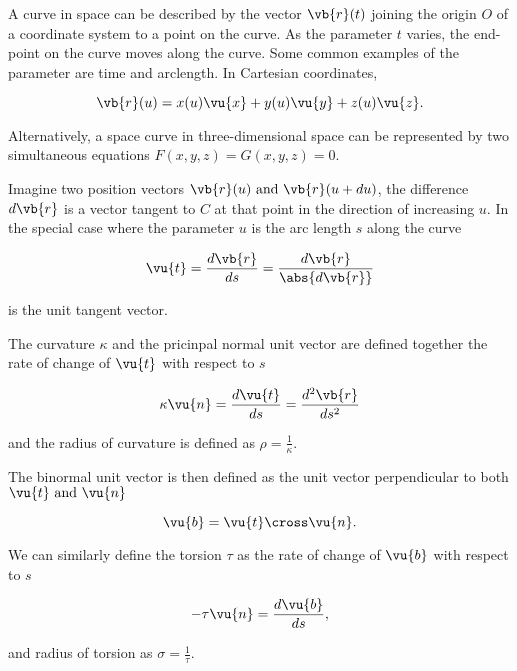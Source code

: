 \documentclass[english,a4paper,12pt]{report}
\begin{document}
A curve in space can be described by the vector \(\vb{r} (t)\) joining the origin \(O\) of a coordinate system to a point on the curve. As the parameter \(t\) varies, the end-point on the curve moves along the curve. Some common examples of the parameter are time and arclength. In Cartesian coordinates, 

\begin{equation}
	\vb{r} (u) = x(u) \vu{x} + y(u) \vu{y} + z(u) \vu{z} .
\end{equation}

Alternatively, a space curve in three-dimensional space can be represented by two simultaneous equations \(F(x,y,z) = G(x,y,z) = 0\). 

Imagine two position vectors \(\vb{r} (u) \text { and } \vb{r} (u + du)\), the difference \(d \vb{r} \)  is a vector tangent to \(C\) at that point in the direction of increasing \(u\). In the special case where the parameter \(u\) is the arc length \(s\) along the curve 

\begin{equation}
	\vu{t} = \frac{d\vb{r} }{ds} = \frac{d \vb{r} }{\abs{d \vb{r} } } 
\end{equation}

is the unit tangent vector.

The curvature \(\kappa \) and the pricinpal normal unit vector are defined together the rate of change of \(\vu{t} \) with respect to \(s\)

\begin{equation}
	\kappa \vu{n}  = \frac{d \vu{t} }{ds} = \frac{d^2\vb{r} }{ds^2}
\end{equation}

and the radius of curvature is defined as \(\rho = \frac{1}{\kappa } \). 

The binormal unit vector is then defined as the unit vector perpendicular to both \(\vu{t}  \text { and } \vu{n} \) 

\begin{equation}
	\vu{b} = \vu{t} \cross \vu{n} .
\end{equation}

We can similarly define the torsion \(\tau \) as the rate of change of \(\vu{b} \) with respect to \(s\)  

\begin{equation}
	-\tau \vu{n} =  \frac{d \vu{b} }{ds}, 
\end{equation}

and radius of torsion as \(\sigma  = \frac{1}{\tau } \). 
\end{document}
